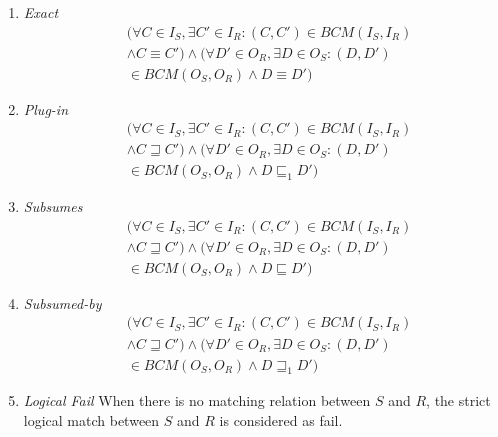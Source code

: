 \documentclass{ieeeaccess}
\begin{document}
\begin{enumerate}
\item\textit{Exact}
\begin{align}
&( \forall C\in I_{S}, \exists {C}'\in I_{R}:( C,{C}')\in BCM( I_{S},I_{R} )\nonumber \\
&\wedge C\equiv C' )\wedge( \forall {D}'\in O_{R}, \exists D\in O_{S}:( D,{D}' )\nonumber \\
&\in BCM( O_{S},O_{R} )\wedge D\equiv {D}' ) 
\end{align}

 
\item\textit{Plug-in}
\begin{align}
&( \forall C\in I_{S}, \exists {C}'\in I_{R}:( C,{C}')\in BCM( I_{S},I_{R} )\nonumber \\
&\wedge C\sqsupseteq C' )\wedge( \forall {D}'\in O_{R}, \exists D\in O_{S}:( D,{D}' )\nonumber \\
&\in BCM( O_{S},O_{R} )\wedge D\sqsubseteq_{1} {D}' ) 
\end{align}
 
\item\textit{Subsumes}
\begin{align}
&( \forall C\in I_{S}, \exists {C}'\in I_{R}:( C,{C}')\in BCM( I_{S},I_{R} )\nonumber \\
&\wedge C\sqsupseteq C' )\wedge( \forall {D}'\in O_{R}, \exists D\in O_{S}:( D,{D}' )\nonumber \\
&\in BCM( O_{S},O_{R} )\wedge D\sqsubseteq {D}' ) 
\end{align}

\item\textit{Subsumed-by}
\begin{align}
&( \forall C\in I_{S}, \exists {C}'\in I_{R}:( C,{C}')\in BCM( I_{S},I_{R} )\nonumber \\
&\wedge C\sqsupseteq C' )\wedge( \forall {D}'\in O_{R}, \exists D\in O_{S}:( D,{D}' )\nonumber \\
&\in BCM( O_{S},O_{R} )\wedge D\sqsupseteq_{1} {D}' ) 
\end{align}
 
\item\textit{Logical Fail} When there is no matching relation between $S$ and $R$, the strict logical match between $S$ and $R$ is considered as fail.
\end{enumerate}
\end{document}
